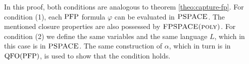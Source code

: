 In this proof, both conditions are analogous to theorem \ref{theo:capture-fp}. For condition (1), each ${\rm PFP}$ formula $\varphi$ can be evaluated in $\text{\sc PSPACE}$. The mentioned closure properties are also possessed by $\text{\sc FPSPACE(poly)}$. For condition (2) we define the same variables and the same language $L$, which in this case is in $\text{\sc PSPACE}$. The same construction of $\alpha$, which in turn is in ${\rm QFO}({\rm PFP})$, is used to show that the condition holds.